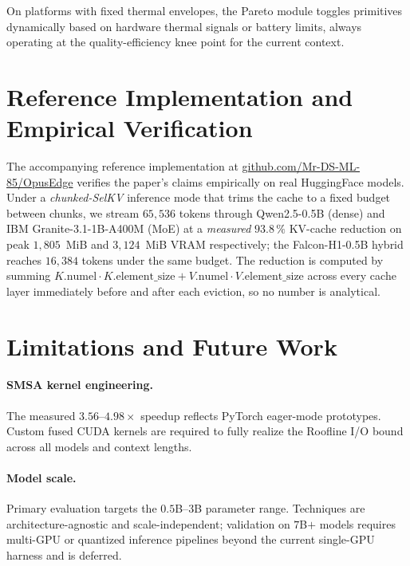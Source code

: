 \documentclass[11pt]{article}
\begin{document}
On platforms with fixed thermal envelopes, the Pareto module toggles
primitives dynamically based on hardware thermal signals or battery limits,
always operating at the quality-efficiency knee point for the current
context.

\section{Reference Implementation and Empirical Verification}
The accompanying reference implementation at
\href{https://github.com/Mr-DS-ML-85/OpusEdge}{github.com/Mr-DS-ML-85/OpusEdge}
verifies the paper's claims empirically on real HuggingFace models. Under a
\emph{chunked-SelKV} inference mode that trims the cache to a fixed budget
between chunks, we stream $65{,}536$ tokens through Qwen2.5-0.5B (dense) and
IBM Granite-3.1-1B-A400M (MoE) at a \emph{measured} $93.8\,\%$ KV-cache
reduction on peak $1{,}805$~MiB and $3{,}124$~MiB VRAM respectively; the
Falcon-H1-0.5B hybrid reaches $16{,}384$ tokens under the same budget. The
reduction is computed by summing
$K.\mathrm{numel} \cdot K.\mathrm{element\_size} + V.\mathrm{numel} \cdot V.\mathrm{element\_size}$
across every cache layer immediately before and after each eviction, so no
number is analytical.

\section{Limitations and Future Work}
\paragraph{SMSA kernel engineering.}
The measured $3.56$--$4.98\!\times$ speedup reflects PyTorch eager-mode
prototypes. Custom fused CUDA kernels are required to fully realize the
Roofline I/O bound across all models and context lengths.

\paragraph{Model scale.}
Primary evaluation targets the $0.5$B--$3$B parameter range. Techniques are
architecture-agnostic and scale-independent; validation on $7$B$+$ models
requires multi-GPU or quantized inference pipelines beyond the current
single-GPU harness and is deferred.
\end{document}
